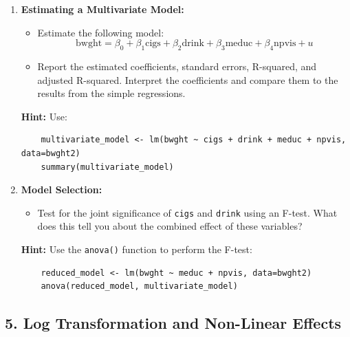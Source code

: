 \documentclass[11pt,a4paper,english]{article}
\begin{document}
\begin{enumerate}[itemsep=-0.5ex]
    \item \textbf{Estimating a Multivariate Model:}
    \begin{itemize}[itemsep=-0.5ex]
        \item Estimate the following model:
        \[
        \text{bwght} = \beta_0 + \beta_1 \text{cigs} + \beta_2 \text{drink} + \beta_3 \text{meduc} + \beta_4 \text{npvis} + u
        \]
        \item Report the estimated coefficients, standard errors, R-squared, and adjusted R-squared. Interpret the coefficients and compare them to the results from the simple regressions.
    \end{itemize}
    \textbf{Hint:} Use:
    \begin{verbatim}
    multivariate_model <- lm(bwght ~ cigs + drink + meduc + npvis, data=bwght2)
    summary(multivariate_model)
    \end{verbatim}
    
    \item \textbf{Model Selection:}
    \begin{itemize}[itemsep=-0.5ex]
        \item Test for the joint significance of \texttt{cigs} and \texttt{drink} using an F-test. What does this tell you about the combined effect of these variables?
    \end{itemize}
    \textbf{Hint:} Use the \texttt{anova()} function to perform the F-test:
    \begin{verbatim}
    reduced_model <- lm(bwght ~ meduc + npvis, data=bwght2)
    anova(reduced_model, multivariate_model)
    \end{verbatim}
    
\end{enumerate}

\subsection*{5. Log Transformation and Non-Linear Effects}
\end{document}

